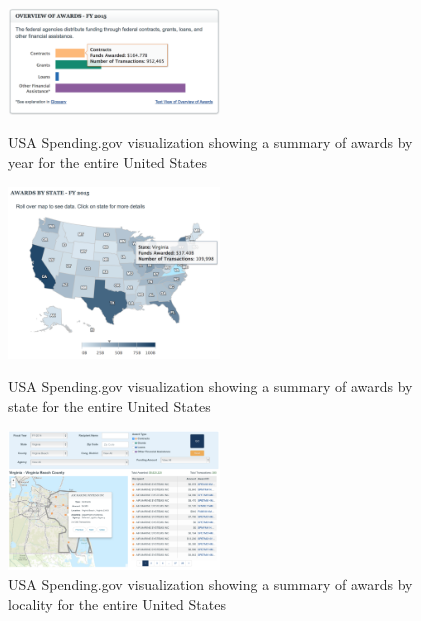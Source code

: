 \documentclass[10pt,journal,compsoc]{IEEEtran}
\begin{document}
\begin{figure}[htbp]
	\centering
	\includegraphics[width=0.5\textwidth]{images/existing-awards-by-year.png}
	\caption{USA Spending.gov visualization showing a summary of awards by year for the entire United States}
	\label{fig:existing-awards-by-year}

	\vspace{5em}

	\centering
	\includegraphics[width=0.5\textwidth]{images/existing-awards-by-state.png}
	\caption{USA Spending.gov visualization showing a summary of awards by state for the entire United States}
	\label{fig:existing-awards-by-state}

	\vspace{5em}

	\centering
	\includegraphics[width=0.5\textwidth]{images/existing-awards-by-locality.png}
	\caption{USA Spending.gov visualization showing a summary of awards by locality for the entire United States}
	\label{fig:existing-awards-by-locality}
\end{figure}
\end{document}
